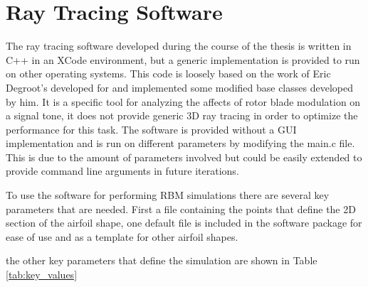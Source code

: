 \chapter{Ray Tracing Software}

The ray tracing software developed during the course of the thesis is written in C++ in an XCode environment, but a generic implementation is provided to run on other operating systems. This code is loosely based on the work of Eric Degroot's developed for \cite{Groot2015} and implemented some modified base classes developed by him. It is a specific tool for analyzing the affects of rotor blade modulation on a signal tone, it does not provide generic 3D ray tracing in order to optimize the performance for this task. The software is provided without a GUI implementation and is run on different parameters by modifying the main.c file. This is due to the amount of parameters involved but could be easily extended to provide command line arguments in future iterations.

To use the software for performing RBM simulations there are several key parameters that are needed. First a file containing the points that define the 2D section of the airfoil shape, one default file is included in the software package for ease of use and as a template for other airfoil shapes.

the other key parameters that define the simulation are shown in Table \ref{tab:key_values}

